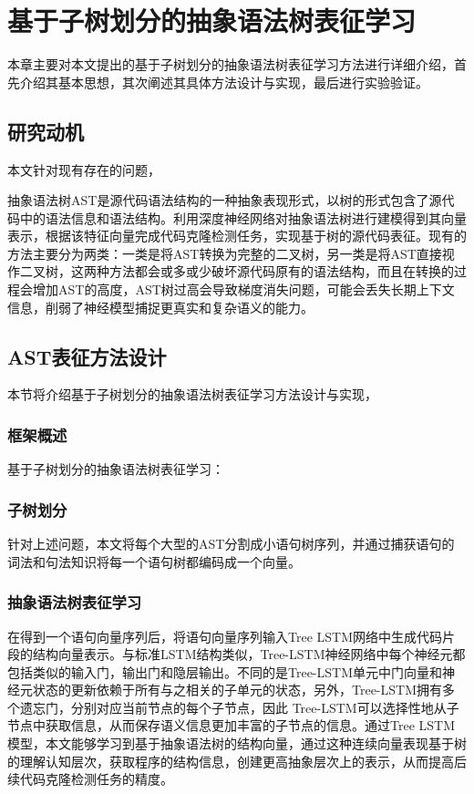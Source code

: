 \chapter{基于子树划分的抽象语法树表征学习}
\label{chap:AST}
本章主要对本文提出的基于子树划分的抽象语法树表征学习方法进行详细介绍，首先介绍其基本思想，其次阐述其具体方法设计与实现，最后进行实验验证。
\section{研究动机}
本文针对现有存在的问题，

抽象语法树AST是源代码语法结构的一种抽象表现形式，以树的形式包含了源代码中的语法信息和语法结构。利用深度神经网络对抽象语法树进行建模得到其向量表示，根据该特征向量完成代码克隆检测任务，实现基于树的源代码表征。现有的方法主要分为两类：一类是将AST转换为完整的二叉树，另一类是将AST直接视作二叉树，这两种方法都会或多或少破坏源代码原有的语法结构，而且在转换的过程会增加AST的高度，AST树过高会导致梯度消失问题，可能会丢失长期上下文信息，削弱了神经模型捕捉更真实和复杂语义的能力。
\section{AST表征方法设计}

本节将介绍基于子树划分的抽象语法树表征学习方法设计与实现， 

\subsection{框架概述}
基于子树划分的抽象语法树表征学习：

\subsection{子树划分}
针对上述问题，本文将每个大型的AST分割成小语句树序列，并通过捕获语句的词法和句法知识将每一个语句树都编码成一个向量。
\subsection{抽象语法树表征学习}
在得到一个语句向量序列后，将语句向量序列输入Tree LSTM网络中生成代码片段的结构向量表示。与标准LSTM结构类似，Tree-LSTM神经网络中每个神经元都包括类似的输入门，输出门和隐层输出。不同的是Tree-LSTM单元中门向量和神经元状态的更新依赖于所有与之相关的子单元的状态，另外，Tree-LSTM拥有多个遗忘门，分别对应当前节点的每个子节点，因此 Tree-LSTM可以选择性地从子节点中获取信息，从而保存语义信息更加丰富的子节点的信息。通过Tree LSTM模型，本文能够学习到基于抽象语法树的结构向量，通过这种连续向量表现基于树的理解认知层次，获取程序的结构信息，创建更高抽象层次上的表示，从而提高后续代码克隆检测任务的精度。


